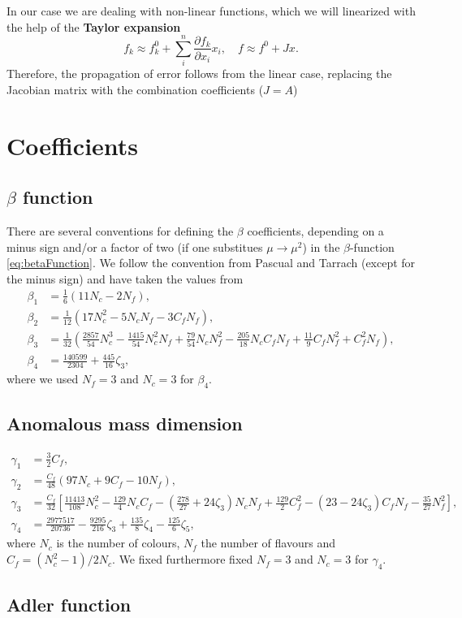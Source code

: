 \documentclass[../../index.tex]{subfiles}
\begin{document}
  In our case we are dealing with non-linear functions, which we will
  linearized with the help of the \textbf{Taylor expansion}
  \begin{equation}
    f_k \approx f_k^0 + \sum_i^n \frac{\partial f_k}{\partial x_i} x_i, \quad f \approx f^0 + Jx.
  \end{equation}
  Therefore, the propagation of error follows from the linear case, replacing
  the Jacobian matrix with the combination coefficients ($J = A$)

  \chapter{Coefficients}
  \label{app:coefficients}
  \section{$\beta$ function}
  \label{sec:betaCoefficients}
  There are several conventions for defining the $\beta$ coefficients, depending
  on a minus sign and/or a factor of two (if one substitues $\mu \to \mu^2$) in
  the $\beta$-function \ref{eq:betaFunction}. We follow the convention from
  Pascual and Tarrach (except for the minus sign) and have taken the values from
  \cite{Boito2011}
  \begin{align}
    \beta_1 &= \frac{1}{6} (11N_c - 2N_f), \\
    \beta_2 &= \frac{1}{12} (17N_c^2 - 5N_cN_f - 3 C_fN_f), \\
    \beta_3 &= \frac{1}{32}\left( \frac{2857}{54}N_c^3 -\frac{1415}{54}N_c^2 N_f + \frac{79}{54} N_c N_f^2 - \frac{205}{18} N_c C_f N_f + \frac{11}{9} C_f N_f^2 + C_f^2 N_f \right), \\
    \beta_4 &= \frac{140599}{2304} + \frac{445}{16}\zeta_3,
  \end{align}
  where we used $N_f=3$ and $N_c=3$ for $\beta_4$.

  \section{Anomalous mass dimension}
  \label{app:gammaCoefficients}
  \begin{align}
    \gamma_1 &= \frac{3}{2}C_f, \\
    \gamma_2 &= \frac{C_f}{48}(97 N_c + 9 C_f - 10N_f), \\
    \gamma_3 &= \frac{C_f}{32}\left[ \frac{11413}{108} N_c^2 - \frac{129}{4} N_cC_f - \left( \frac{278}{27} + 24 \zeta_3 \right) N_c N_f + \frac{129}{2} C_f^2 - (23 - 24 \zeta_3) C_f N_f - \frac{35}{27} N_f^2 \right], \\
    \gamma_4 &= \frac{2977517}{20736} - \frac{9295}{216}\zeta_3 + \frac{135}{8}\zeta_4 - \frac{125}{6}\zeta_5,
  \end{align}
  where $N_c$ is the number of colours, $N_f$ the number of flavours and
  $C_f=(N_c^2-1)/2N_c$. We fixed furthermore fixed
  $N_f=3$ and $N_c=3$ for $\gamma_4$.


  \section{Adler function}

  
\end{document}
